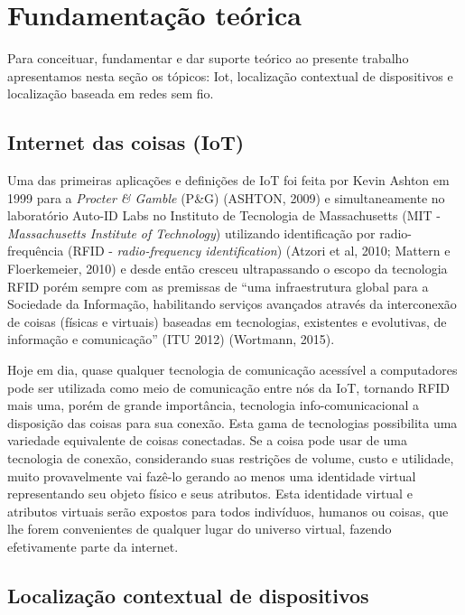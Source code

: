\chapter{Fundamentação teórica}
\label{chap:Fundamentação teorica}


Para conceituar, fundamentar e dar suporte teórico ao presente trabalho apresentamos nesta seção os tópicos: Iot, localização contextual de dispositivos e localização baseada em redes sem fio.

\section{Internet das coisas (IoT)}
\label{sec:INTERNET DAS COISAS (IOT)}

Uma das primeiras aplicações e definições de IoT foi feita por Kevin Ashton em 1999 para a \textit{Procter \& Gamble} (P\&G) 
(ASHTON, 2009) 
\cite{ASHTON2009}
e simultaneamente no laboratório Auto-ID Labs no Instituto de Tecnologia de Massachusetts 
(MIT - \textit{Massachusetts Institute of Technology}) 
utilizando identificação por radio-frequência 
(RFID - \textit{radio-frequency identification}) 
\cite{ATZORI2010} \cite{MATTERN2010}
(Atzori et al, 2010; Mattern e Floerkemeier, 2010)
 e desde então cresceu ultrapassando o escopo da tecnologia RFID porém sempre com as premissas de 
 ``uma infraestrutura global para a Sociedade da Informação, habilitando serviços avançados através da interconexão de coisas (físicas e virtuais) baseadas em tecnologias, existentes e evolutivas, de informação e comunicação'' 
 \cite{InternationalTelecommunicationUnion2012} \cite{Wortmann2015}
 (ITU 2012) (Wortmann, 2015).
 
Hoje em dia, quase qualquer tecnologia de comunicação acessível a computadores pode ser utilizada como meio de comunicação entre nós da IoT, tornando RFID mais uma, porém de grande importância, tecnologia info-comunicacional a disposição das coisas para sua conexão. Esta gama de tecnologias possibilita uma variedade equivalente de coisas conectadas. Se a coisa pode usar de uma tecnologia de conexão, considerando suas restrições de volume, custo e utilidade, muito provavelmente vai fazê-lo gerando ao menos uma identidade virtual representando seu objeto físico e seus atributos. Esta identidade virtual e atributos virtuais serão expostos para todos indivíduos, humanos ou coisas, que lhe forem convenientes de qualquer lugar do universo virtual, fazendo efetivamente parte da internet.

\section{Localização contextual de dispositivos}
\label{sec:Localização contextual de dispositivos}


